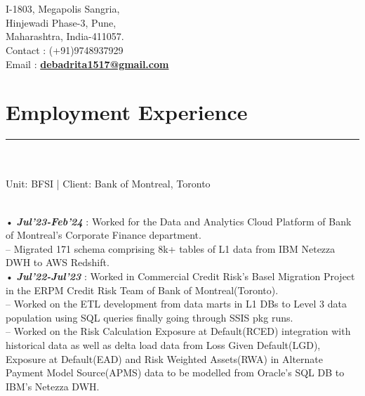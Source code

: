 \documentclass[]{class}
\begin{document}
\begin{minipage}[t]{0.66\textwidth} 
\hspace*{0pt}\hfill    \\
\hspace*{0pt}\hfill    \\
\hspace*{0pt}\hfill I-1803, Megapolis Sangria,\\
\hspace*{0pt}\hfill Hinjewadi Phase-3, Pune,\\
\hspace*{0pt}\hfill Maharashtra, India-411057. \\
\hspace*{0pt}\hfill Contact : (+91)9748937929 \\
\hspace*{0pt}\hfill Email : \textbf{\href{mailto:debadrita1517@gmail.com}{debadrita1517@gmail.com}}
\section{Employment Experience}
\noindent\rule{12.5cm}{0.4pt}
 
\noindent
\hspace{5em}%
\begin{minipage}{0.85\textwidth\vspace{2pt}}\\
\\
Unit: BFSI | Client: Bank of Montreal, Toronto\\\

• \textbf{\textit{Jul'23-Feb'24}} : Worked for the Data and Analytics Cloud Platform of Bank of Montreal's Corporate Finance department.\\
-- Migrated 171 schema comprising 8k+ tables of L1 data from IBM Netezza DWH to AWS Redshift.\\
  
• \textbf{\textit{Jul'22-Jul'23}} : Worked in Commercial Credit Risk's Basel Migration Project in the ERPM Credit Risk Team of Bank of Montreal(Toronto).\\
-- Worked on the ETL development from data marts in L1 DBs to Level 3 data population using SQL queries finally going through SSIS pkg runs.\\
-- Worked on the Risk Calculation Exposure at Default(RCED) integration with historical data as well as delta load data from Loss Given Default(LGD), Exposure at Default(EAD) and Risk Weighted Assets(RWA) in Alternate Payment Model Source(APMS) data to be modelled from Oracle's SQL DB to IBM's Netezza DWH.\\


\end{minipage}
\end{minipage}
\end{document}
